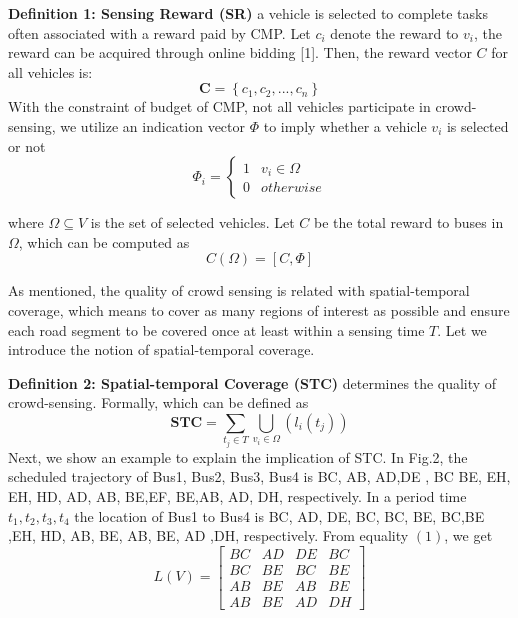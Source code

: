 \documentclass[journal]{IEEEtran}
\begin{document}
\noindent
\textbf{Definition 1: Sensing Reward (SR)} a vehicle is selected to complete tasks often associated with a reward paid by CMP. Let $c_{i}$ denote the reward to $v_{i}$, the reward can be acquired through online bidding [1]. Then, the reward vector $C$ for all vehicles is:
\begin{equation}
\textbf{C}=\left \{c_{1},c_{2},...,c_{n} \right \}
\end{equation}
With the constraint of budget of CMP, not all vehicles participate in crowd-sensing, we utilize an indication vector $\Phi $ to imply whether a vehicle $v_{i}$ is selected or not
\begin{equation}
\Phi_{i}= \left\{\begin{matrix}
1&v_{i}\in \Omega \\ 
0&otherwise\end{matrix}\right.
\end{equation}

where $\Omega \subseteq V$ is the set of selected vehicles. Let $C$ be the total reward to buses in $\Omega$, which can be computed as
\begin{equation}
C(\Omega )=\left [ C,\Phi  \right ]
\end{equation}

As mentioned, the quality of crowd sensing is related with spatial-temporal coverage, which means to cover as many regions of interest as possible and ensure each road segment to be covered once at least within a sensing time $T$. Let we introduce the notion of spatial-temporal coverage.

\noindent
\textbf{Definition 2: Spatial-temporal Coverage (STC)} determines the quality of crowd-sensing. Formally, which can be defined as
\begin{equation}
\textbf{STC}=\sum_{t_{j}\in T}\bigcup_{v_{i}\in \Omega}\left (l_{i}(t_{j}) \right)
\end{equation}
Next, we show an example to explain the implication of STC. In Fig.2, the scheduled trajectory of Bus1, Bus2, Bus3, Bus4 is {BC, AB, AD,DE }, {BC BE, EH}, {EH, HD, AD, AB, BE},{EF, BE,AB, AD, DH}, respectively. In a period time $t_{1},t_{2},t_{3},t_{4}$ the location of  Bus1 to Bus4 is {BC, AD, DE, BC}, {BC, BE, BC,BE },{EH, HD, AB, BE}, {AB, BE, AD ,DH}, respectively. From equality $(1)$, we get
\begin{equation}
L(V)=\begin{bmatrix}
BC &AD &DE &BC \\ 
BC& BE &BC &BE\\ 
AB& BE &AB &BE\\ 
AB& BE &AD &DH
\end{bmatrix}
\end{equation}
\end{document}
